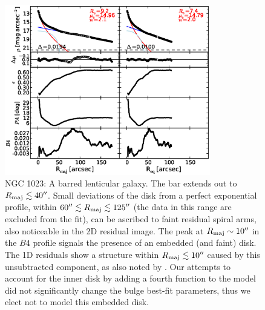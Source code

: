 \documentclass[preprint2]{emulateapj}
\newcommand{\fitfigurewidth}{0.8\textwidth}
\begin{document}
  \begin{figure}[h]
  \begin{center}
  \includegraphics[width=\fitfigurewidth]{images/n1023_1Dfit.eps}
  \caption{NGC 1023:
  A barred lenticular galaxy. 
  The bar extends out to $R_{\rm maj} \lesssim 40''$.
  Small deviations of the disk from a perfect exponential profile, 
  within $60'' \lesssim R_{\rm maj} \lesssim 125''$ (the data in this range are excluded from the fit), 
  can be ascribed to faint residual spiral arms, also noticeable in the 2D residual image. 
  The peak at $R_{\rm maj} \sim 10''$ in the $B4$ profile signals the presence of an embedded (and faint) disk.
  The 1D residuals show a structure within $R_{\rm maj} \lesssim 10''$ caused by this unsubtracted 
  component, as also noted by \cite{lasker2014data}.
  Our attempts to account for the inner disk by adding a fourth function to the model 
  did not significantly change the bulge best-fit parameters,
  thus we elect not to model this embedded disk. 
  }
  \end{center}
  \end{figure}
\end{document}
